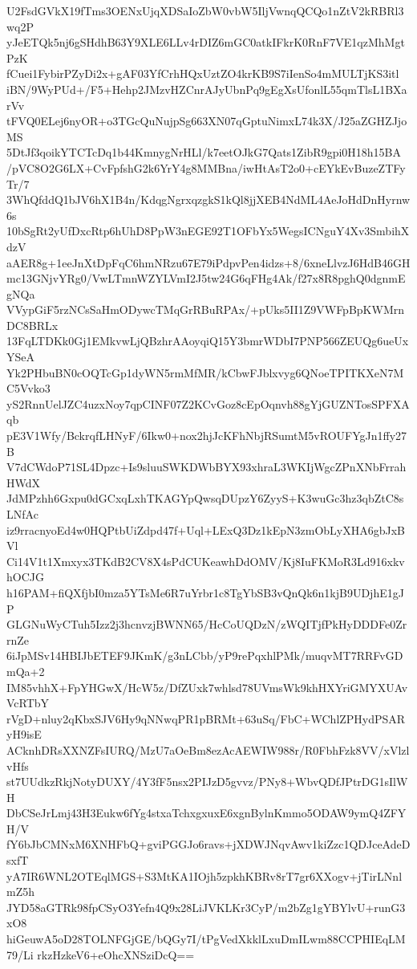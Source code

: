 U2FsdGVkX19fTms3OENxUjqXDSaIoZbW0vbW5IljVwnqQCQo1nZtV2kRBRl3wq2P
yJeETQk5nj6gSHdhB63Y9XLE6LLv4rDIZ6mGC0atkIFkrK0RnF7VE1qzMhMgtPzK
fCuei1FybirPZyDi2x+gAF03YfCrhHQxUztZO4krKB9S7iIenSo4mMULTjKS3itl
iBN/9WyPUd+/F5+Hehp2JMzvHZCnrAJyUbnPq9gEgXsUfonlL55qmTlsL1BXarVv
tFVQ0ELej6nyOR+o3TGcQuNujpSg663XN07qGptuNimxL74k3X/J25aZGHZJjoMS
5DtJf3qoikYTCTcDq1b44KmnygNrHLl/k7eetOJkG7Qats1ZibR9gpi0H18h15BA
/pVC8O2G6LX+CvFpfshG2k6YrY4g8MMBna/iwHtAsT2o0+cEYkEvBuzeZTFyTr/7
3WhQfddQ1bJV6hX1B4n/KdqgNgrxqzgkS1kQl8jjXEB4NdML4AeJoHdDnHyrnw6s
10bSgRt2yUfDxcRtp6hUhD8PpW3nEGE92T1OFbYx5WegsICNguY4Xv3SmbihXdzV
aAER8g+1eeJnXtDpFqC6hmNRzu67E79iPdpvPen4idzs+8/6xneLlvzJ6HdB46GH
mc13GNjvYRg0/VwLTmnWZYLVmI2J5tw24G6qFHg4Ak/f27x8R8pghQ0dgnmEgNQa
VVypGiF5rzNCsSaHmODywcTMqGrRBuRPAx/+pUks5II1Z9VWFpBpKWMrnDC8BRLx
13FqLTDKk0Gj1EMkvwLjQBzhrAAoyqiQ15Y3bmrWDbI7PNP566ZEUQg6ueUxYSeA
Yk2PHbuBN0cOQTcGp1dyWN5rmMfMR/kCbwFJblxvyg6QNoeTPITKXeN7MC5Vvko3
yS2RnnUelJZC4uzxNoy7qpCINF07Z2KCvGoz8cEpOqnvh88gYjGUZNTosSPFXAqb
pE3V1Wfy/BckrqfLHNyF/6Ikw0+nox2hjJcKFhNbjRSumtM5vROUFYgJn1ffy27B
V7dCWdoP71SL4Dpzc+Is9sluuSWKDWbBYX93xhraL3WKIjWgcZPnXNbFrrahHWdX
JdMPzhh6Gxpu0dGCxqLxhTKAGYpQwsqDUpzY6ZyyS+K3wuGc3hz3qbZtC8sLNfAc
iz9rracnyoEd4w0HQPtbUiZdpd47f+Uql+LExQ3Dz1kEpN3zmObLyXHA6gbJxBVl
Ci14V1t1Xmxyx3TKdB2CV8X4sPdCUKeawhDdOMV/Kj8IuFKMoR3Ld916xkvhOCJG
h16PAM+fiQXfjbI0mza5YTsMe6R7uYrbr1c8TgYbSB3vQnQk6n1kjB9UDjhE1gJP
GLGNuWyCTuh5Izz2j3hcnvzjBWNN65/HcCoUQDzN/zWQITjfPkHyDDDFe0ZrrnZe
6iJpMSv14HBIJbETEF9JKmK/g3nLCbb/yP9rePqxhlPMk/muqvMT7RRFvGDmQa+2
IM85vhhX+FpYHGwX/HcW5z/DfZUxk7whlsd78UVmsWk9khHXYriGMYXUAvVcRTbY
rVgD+nluy2qKbxSJV6Hy9qNNwqPR1pBRMt+63uSq/FbC+WChlZPHydPSARyH9isE
ACknhDRsXXNZFsIURQ/MzU7aOeBm8ezAcAEWIW988r/R0FbhFzk8VV/xVlzlvHfs
st7UUdkzRkjNotyDUXY/4Y3fF5nsx2PIJzD5gvvz/PNy8+WbvQDfJPtrDG1sIlWH
DbCSeJrLmj43H3Eukw6fYg4stxaTchxgxuxE6xgnBylnKmmo5ODAW9ymQ4ZFYH/V
fY6bJbCMNxM6XNHFbQ+gviPGGJo6ravs+jXDWJNqvAwv1kiZzc1QDJceAdeDsxfT
yA7IR6WNL2OTEqlMGS+S3MtKA1IOjh5zpkhKBRv8rT7gr6XXogv+jTirLNnlmZ5h
JYD58aGTRk98fpCSyO3Yefn4Q9x28LiJVKLKr3CyP/m2bZg1gYBYlvU+runG3xO8
hiGeuwA5oD28TOLNFGjGE/bQGy7I/tPgVedXkklLxuDmILwm88CCPHIEqLM79/Li
rkzHzkeV6+eOhcXNSziDcQ==
